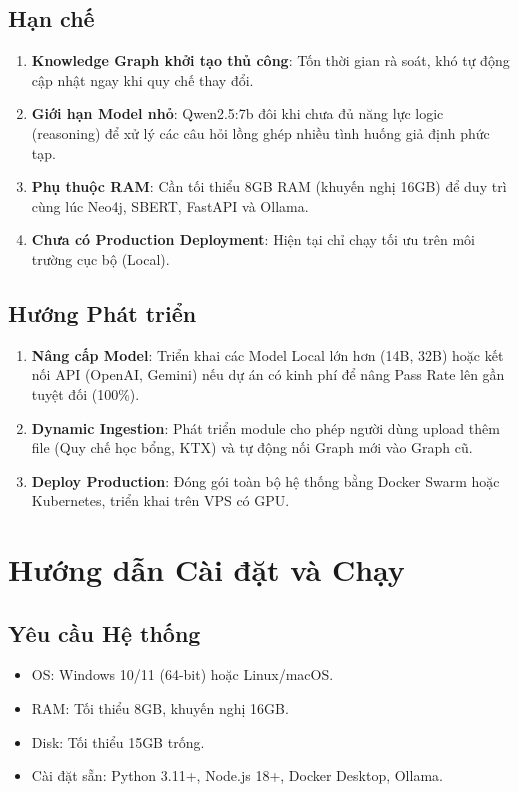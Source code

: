 \documentclass[12pt,a4paper]{article}
\begin{document}
\subsection{Hạn chế}
\begin{enumerate}
\item \textbf{Knowledge Graph khởi tạo thủ công}: Tốn thời gian rà soát, khó tự động cập nhật ngay khi quy chế thay đổi.
\item \textbf{Giới hạn Model nhỏ}: Qwen2.5:7b đôi khi chưa đủ năng lực logic (reasoning) để xử lý các câu hỏi lồng ghép nhiều tình huống giả định phức tạp.
\item \textbf{Phụ thuộc RAM}: Cần tối thiểu 8GB RAM (khuyến nghị 16GB) để duy trì cùng lúc Neo4j, SBERT, FastAPI và Ollama.
\item \textbf{Chưa có Production Deployment}: Hiện tại chỉ chạy tối ưu trên môi trường cục bộ (Local).
\end{enumerate}

\subsection{Hướng Phát triển}
\begin{enumerate}
\item \textbf{Nâng cấp Model}: Triển khai các Model Local lớn hơn (14B, 32B) hoặc kết nối API (OpenAI, Gemini) nếu dự án có kinh phí để nâng Pass Rate lên gần tuyệt đối (100\%).
\item \textbf{Dynamic Ingestion}: Phát triển module cho phép người dùng upload thêm file (Quy chế học bổng, KTX) và tự động nối Graph mới vào Graph cũ.
\item \textbf{Deploy Production}: Đóng gói toàn bộ hệ thống bằng Docker Swarm hoặc Kubernetes, triển khai trên VPS có GPU.
\end{enumerate}

\section{Hướng dẫn Cài đặt và Chạy}
\subsection{Yêu cầu Hệ thống}
\begin{itemize}
\item OS: Windows 10/11 (64-bit) hoặc Linux/macOS.
\item RAM: Tối thiểu 8GB, khuyến nghị 16GB.
\item Disk: Tối thiểu 15GB trống.
\item Cài đặt sẵn: Python 3.11+, Node.js 18+, Docker Desktop, Ollama.
\end{itemize}
\end{document}
